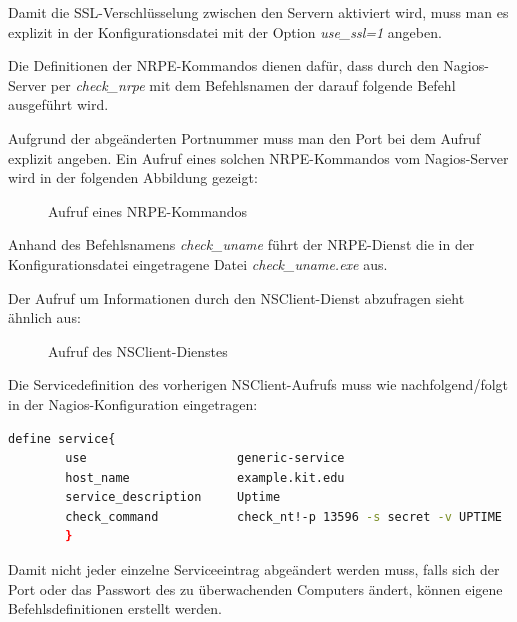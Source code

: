 Damit die \gls{SSL}-Verschlüsselung zwischen den Servern aktiviert wird, muss man es explizit in der Konfigurationsdatei mit der Option \textit{use\_ssl=1} angeben.

Die Definitionen der \gls{NRPE}-Kommandos dienen dafür, dass durch den Nagios-Server per \textit{check\_nrpe} mit dem Befehlsnamen der darauf folgende Befehl ausgeführt wird.

Aufgrund der abgeänderten Portnummer muss man den Port bei dem Aufruf explizit angeben.
Ein Aufruf eines solchen \gls{NRPE}-Kommandos vom Nagios-Server wird in der folgenden Abbildung gezeigt:

\begin{figure}[ht]
	\centering
		\caption{Aufruf eines NRPE-Kommandos}
		\label{nrpecheck}
\end{figure}



Anhand des Befehlsnamens \textit{check\_uname} führt der \gls{NRPE}-Dienst die in der Konfigurationsdatei eingetragene Datei \textit{check\_uname.exe} aus.

Der Aufruf um Informationen durch den NSClient-Dienst abzufragen sieht ähnlich aus:

\begin{figure}[ht]
	\centering
		\caption{Aufruf des NSClient-Dienstes}
		\label{ntcheck}
\end{figure}

Die Servicedefinition des vorherigen NSClient-Aufrufs muss wie nachfolgend/folgt in der Nagios-Konfiguration eingetragen:
\begin{lstlisting}[captionpos=b, caption=Servicedefinition des NSClient-Checks, label=nt-servdef, breaklines = true, language=sh]
define service{
        use                     generic-service
        host_name               example.kit.edu
        service_description     Uptime
        check_command           check_nt!-p 13596 -s secret -v UPTIME
        }
\end{lstlisting}

Damit nicht jeder einzelne Serviceeintrag abgeändert werden muss, falls sich der Port oder das Passwort des zu überwachenden Computers ändert, können eigene Befehlsdefinitionen erstellt werden.

